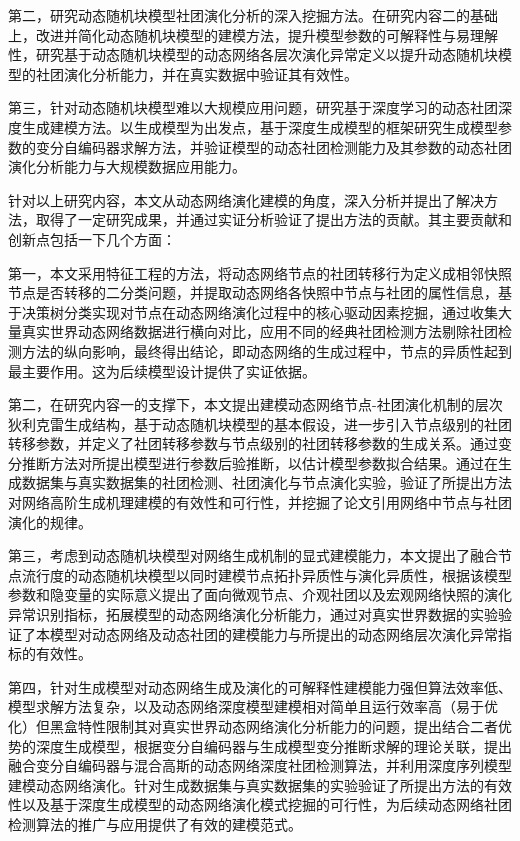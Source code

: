 第二，研究动态随机块模型社团演化分析的深入挖掘方法。在研究内容二的基础上，改进并简化动态随机块模型的建模方法，提升模型参数的可解释性与易理解性，研究基于动态随机块模型的动态网络各层次演化异常定义以提升动态随机块模型的社团演化分析能力，并在真实数据中验证其有效性。

第三，针对动态随机块模型难以大规模应用问题，研究基于深度学习的动态社团深度生成建模方法。以生成模型为出发点，基于深度生成模型的框架研究生成模型参数的变分自编码器求解方法，并验证模型的动态社团检测能力及其参数的动态社团演化分析能力与大规模数据应用能力。

针对以上研究内容，本文从动态网络演化建模的角度，深入分析并提出了解决方法，取得了一定研究成果，并通过实证分析验证了提出方法的贡献。其主要贡献和创新点包括一下几个方面：

第一，本文采用特征工程的方法，将动态网络节点的社团转移行为定义成相邻快照节点是否转移的二分类问题，并提取动态网络各快照中节点与社团的属性信息，基于决策树分类实现对节点在动态网络演化过程中的核心驱动因素挖掘，通过收集大量真实世界动态网络数据进行横向对比，应用不同的经典社团检测方法剔除社团检测方法的纵向影响，最终得出结论，即动态网络的生成过程中，节点的异质性起到最主要作用。这为后续模型设计提供了实证依据。

第二，在研究内容一的支撑下，本文提出建模动态网络节点-社团演化机制的层次狄利克雷生成结构，基于动态随机块模型的基本假设，进一步引入节点级别的社团转移参数，并定义了社团转移参数与节点级别的社团转移参数的生成关系。通过变分推断方法对所提出模型进行参数后验推断，以估计模型参数拟合结果。通过在生成数据集与真实数据集的社团检测、社团演化与节点演化实验，验证了所提出方法对网络高阶生成机理建模的有效性和可行性，并挖掘了论文引用网络中节点与社团演化的规律。

第三，考虑到动态随机块模型对网络生成机制的显式建模能力，本文提出了融合节点流行度的动态随机块模型以同时建模节点拓扑异质性与演化异质性，根据该模型参数和隐变量的实际意义提出了面向微观节点、介观社团以及宏观网络快照的演化异常识别指标，拓展模型的动态网络演化分析能力，通过对真实世界数据的实验验证了本模型对动态网络及动态社团的建模能力与所提出的动态网络层次演化异常指标的有效性。

第四，针对生成模型对动态网络生成及演化的可解释性建模能力强但算法效率低、模型求解方法复杂，以及动态网络深度模型建模相对简单且运行效率高（易于优化）但黑盒特性限制其对真实世界动态网络演化分析能力的问题，提出结合二者优势的深度生成模型，根据变分自编码器与生成模型变分推断求解的理论关联，提出融合变分自编码器与混合高斯的动态网络深度社团检测算法，并利用深度序列模型建模动态网络演化。针对生成数据集与真实数据集的实验验证了所提出方法的有效性以及基于深度生成模型的动态网络演化模式挖掘的可行性，为后续动态网络社团检测算法的推广与应用提供了有效的建模范式。

